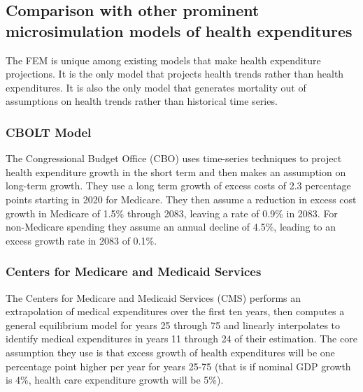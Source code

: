 \subsection{Comparison with other prominent microsimulation models of health expenditures}
The FEM is unique among existing models that make health expenditure projections. It is the only model 
that projects health trends rather than health expenditures. It is also the only model that generates 
mortality out of assumptions on health trends rather than historical time series.

\subsubsection{CBOLT Model}
The Congressional Budget Office (CBO) uses time-series techniques to project health expenditure 
growth in the short term and then makes an assumption on long-term growth. They use a long term 
growth of excess costs of 2.3 percentage points starting in 2020 for Medicare. They then assume a 
reduction in excess cost growth in Medicare of 1.5\% through 2083, leaving a rate of 0.9\% in 2083. 
For non-Medicare spending they assume an annual decline of 4.5\%, leading to an excess growth rate in 
2083 of 0.1\%. 

\subsubsection{Centers for Medicare and Medicaid Services}
The Centers for Medicare and Medicaid Services (CMS) performs an extrapolation of medical expenditures 
over the first ten years, then computes a general equilibrium model for years 25 through 75 and 
linearly interpolates to identify medical expenditures in years 11 through 24 of their estimation. 
The core assumption they use is that excess growth of health expenditures will be one percentage point 
higher per year for years 25-75 (that is if nominal GDP growth is 4\%, health care expenditure growth 
will be 5\%).

